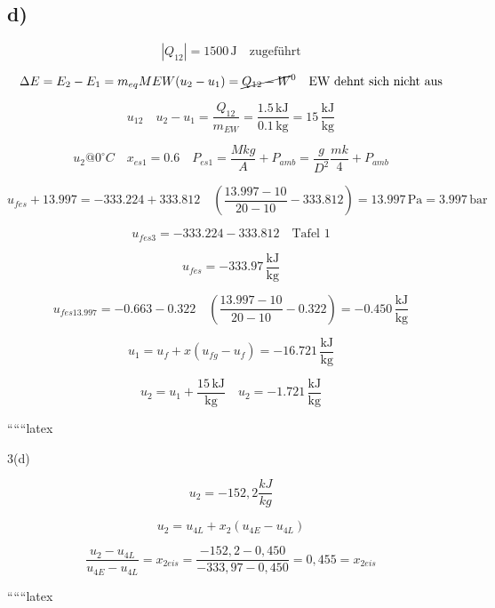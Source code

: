 

\subsection*{d)}
\[
\left| Q_{12} \right| = 1500 \, \text{J} \quad \text{zugeführt}
\]

\[
\Delta E = E_2 - E_1 = m_{eq} MEW (u_2 - u_1) = \cancel{Q_{12} - W}^0 \quad \text{EW dehnt sich nicht aus}
\]

\[
u_{12} \quad u_2 - u_1 = \frac{Q_{12}}{m_{EW}} = \frac{1.5 \, \text{kJ}}{0.1 \, \text{kg}} = 15 \, \frac{\text{kJ}}{\text{kg}}
\]

\[
u_2 @ 0^\circ C \quad x_{es1} = 0.6 \quad P_{es1} = \frac{M k g}{A} + P_{amb} = \frac{g}{D^2} \frac{mk}{4} + P_{amb}
\]

\[
u_{fes} + 13.997 = -333.224 + 333.812 \quad \left( \frac{13.997 - 10}{20 - 10} - 333.812 \right) = 13.997 \, \text{Pa} = 3.997 \, \text{bar}
\]

\[
u_{fes3} = -333.224 - 333.812 \quad \text{Tafel 1}
\]

\[
u_{fes} = -333.97 \, \frac{\text{kJ}}{\text{kg}}
\]

\[
u_{fes13.997} = -0.663 - 0.322 \quad \left( \frac{13.997 - 10}{20 - 10} - 0.322 \right) = -0.450 \, \frac{\text{kJ}}{\text{kg}}
\]

\[
u_1 = u_f + x(u_{fg} - u_f) = -16.721 \, \frac{\text{kJ}}{\text{kg}}
\]

\[
u_2 = u_1 + \frac{15 \, \text{kJ}}{\text{kg}} \quad u_2 = -1.721 \, \frac{\text{kJ}}{\text{kg}}
\]

``````latex

3(d)

\[
u_2 = -152,2 \frac{kJ}{kg}
\]

\[
u_2 = u_{4L} + x_2 (u_{4E} - u_{4L})
\]

\[
\frac{u_2 - u_{4L}}{u_{4E} - u_{4L}} = x_{2eis} = \frac{-152,2 - 0,450}{-333,97 - 0,450} = 0,455 = x_{2eis}
\]

``````latex